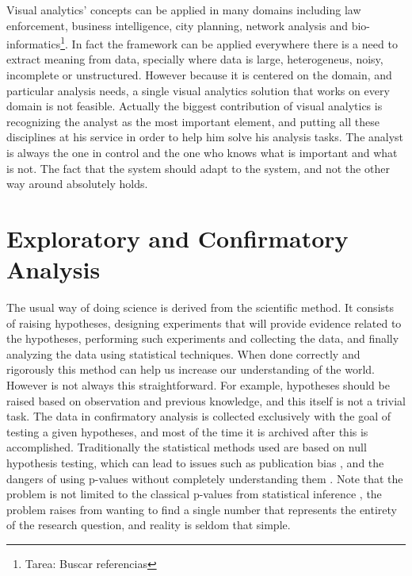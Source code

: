 Visual analytics' concepts can be applied in many domains including law enforcement, business intelligence, city planning, network analysis and bio-informatics\footnote{Tarea: Buscar referencias}. In fact the framework can be applied everywhere there is a need to extract meaning from data, specially where data is large, heterogeneus, noisy, incomplete or unstructured. However because it is centered on the domain, and particular analysis needs, a single visual analytics solution that works on every domain is not feasible. Actually the biggest contribution of visual analytics is recognizing the analyst as the most important element, and putting all these disciplines at his service in order to help him solve his analysis tasks. The analyst is always the one in control and the one who knows what is important and what is not. The fact that the system should adapt to the system, and not the other way around \autocite{norman_design_2002} absolutely holds. 



\section{Exploratory and Confirmatory Analysis}

The usual way of doing science is derived from the scientific method. It consists of raising hypotheses, designing experiments that will provide evidence related to the hypotheses, performing such experiments and collecting the data, and finally analyzing the data using statistical techniques. When done correctly and rigorously this method can help us increase our understanding of the world. However is not always this straightforward. For example, hypotheses should be raised based on observation and previous knowledge, and this itself is not a trivial task. The data in confirmatory analysis is collected exclusively with the goal of testing a given hypotheses, and most of the time it is archived after this is accomplished. Traditionally the statistical methods used are based on null hypothesis testing, which can lead to issues such as publication bias \autocite{ioannidis_why_2005}, and the dangers of using p-values without completely understanding them \autocite{halsey_fickle_2015, nuzzo_scientific_2014, woolston_psychology_2015}. Note that the problem is not limited to the classical p-values from statistical inference \autocite{gelman_so-called_2011}, the problem raises from wanting to find a single number that represents the entirety of the research question, and reality is seldom that simple.    

